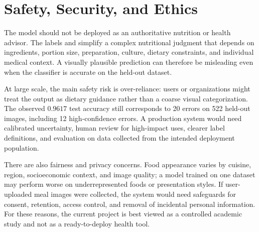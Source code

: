 \section{Safety, Security, and Ethics}

The model should not be deployed as an authoritative nutrition or health advisor. The labels \Healthy{} and \Unhealthy{} simplify a complex nutritional judgment that depends on ingredients, portion size, preparation, culture, dietary constraints, and individual medical context. A visually plausible prediction can therefore be misleading even when the classifier is accurate on the held-out dataset.

At large scale, the main safety risk is over-reliance: users or organizations might treat the output as dietary guidance rather than a coarse visual categorization. The observed \(0.9617\) test accuracy still corresponds to 20 errors on 522 held-out images, including 12 high-confidence errors. A production system would need calibrated uncertainty, human review for high-impact uses, clearer label definitions, and evaluation on data collected from the intended deployment population.

There are also fairness and privacy concerns. Food appearance varies by cuisine, region, socioeconomic context, and image quality; a model trained on one dataset may perform worse on underrepresented foods or presentation styles. If user-uploaded meal images were collected, the system would need safeguards for consent, retention, access control, and removal of incidental personal information. For these reasons, the current project is best viewed as a controlled academic study and not as a ready-to-deploy health tool.
